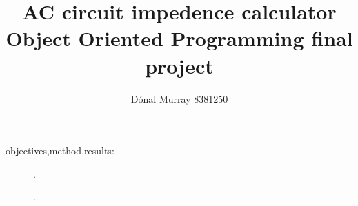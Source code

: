 \documentclass[10pt,a4paper,twoside]{article}
\title{\textbf{AC circuit impedence calculator \\ \large{Object Oriented Programming final project}}}
\author{D\'onal Murray 8381250}
\date{}
\begin{document}
  \maketitle

  \begin{center}
    objectives,method,results: \lipsum[1]
  \end{center}

  \begin{figure}[b]
    \centering
    \captionsetup{justification=centering}
    \caption{\cite{ref:1}.}
    \label{fig:1}
  \end{figure}

  \begin{figure}[t]
    \centering
    \captionsetup{justification=centering}
    \caption{\cite{ref:2}.}
    \label{fig:2}
  \end{figure}
\end{document}
